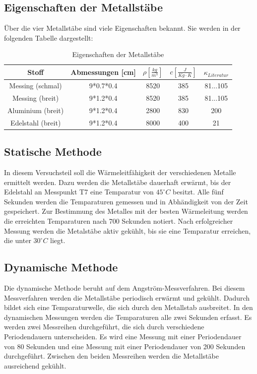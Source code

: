 \documentclass[11pt]{article}
\begin{document}
\subsection{Eigenschaften der Metallstäbe}
Über die vier Metallstäbe sind viele Eigenschaften bekannt. Sie werden in der folgenden Tabelle dargestellt:
\begin{table}[h]
\centering
\begin{tabular}{|c|c|c|c|c|}
\hline
Stoff & Abmessungen [cm] & $\rho \left[ \frac{kg}{m^3} \right] $ & $c \left[ \frac{J}{Kg \cdot K} \right]$ & $ \kappa_{Literatur}$ \\
\hline
Messing (schmal) & 9*0.7*0.4 & 8520 & 385 & 81...105\\
Messing (breit) & 9*1.2*0.4 & 8520 & 385 & 81...105\\
Aluminium (breit) & 9*1.2*0.4 & 2800 & 830 & 200\\
Edelstahl (breit) & 9*1.2*0.4 & 8000 & 400 & 21\\
\hline
\end{tabular}
\caption{Eigenschaften der Metallstäbe}
\end{table}
\subsection{Statische Methode}
In diesem Versuchsteil soll die Wärmeleitfähigkeit der verschiedenen Metalle ermittelt werden. Dazu werden die Metallstäbe dauerhaft erwärmt, bis der Edelstahl an Messpunkt T7 eine Temparatur von $45^\circ C$ besitzt. Alle fünf Sekunden werden die Temparaturen gemessen und in Abhändigkeit von der Zeit gespeichert. Zur Bestimmung des Metalles mit der besten Wärmeleitung werden die erreichten Temparaturen nach 700 Sekunden notiert. Nach erfolgreicher Messung werden die Metalstäbe aktiv gekühlt, bis sie eine Temparatur erreichen, die unter $30^\circ C$ liegt.
\subsection{Dynamische Methode}
Die dynamische Methode beruht auf dem Angström-Messverfahren. Bei diesem Messverfahren werden die Metallstäbe periodisch erwärmt und gekühlt. Dadurch bildet sich eine Temparaturwelle, die sich durch den Metallstab ausbreitet.
In den dynamischen Messungen werden die Temparaturen alle zwei Sekunden erfasst.
Es werden zwei Messreihen durchgeführt, die sich durch verschiedene Periodendauern unterscheiden. Es wird eine Messung mit einer Periodendauer von 80 Sekunden und eine Messung mit einer Periodendauer von 200 Sekunden durchgeführt. Zwischen den beiden Messreihen werden die Metallstäbe ausreichend gekühlt.
\end{document}

